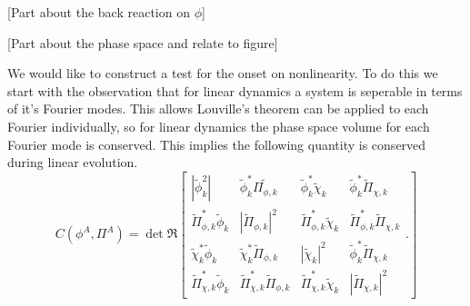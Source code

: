 [Part about the back reaction on $\phi$]

[Part about the phase space and relate to figure]

\Fspec

\Fspecdet

We would like to construct a test for the onset on nonlinearity.
To do this we start with the observation that for linear dynamics a system is seperable in terms of it's Fourier modes.
This allows Louville's theorem can be applied to each Fourier individually, so for linear dynamics the phase space volume for each Fourier mode is conserved.
This implies the following quantity is conserved during linear evolution.
\begin{equation}
  C(\phi^A,\Pi^A) =
  \det\Re\left[
    \begin{matrix}
      |\tilde{\phi}_k^2| & \tilde{\phi}_k^*\tilde{\Pi_{\phi, k}} & \tilde{\phi}_k^*\tilde{\chi}_k & \tilde{\phi}_k^*\tilde{\Pi}_{\chi, k} \\
      \tilde{\Pi}_{\phi,k}^*\tilde{\phi}_k & |\tilde{\Pi}_{\phi, k}|^2 & \tilde{\Pi}_{\phi,k}^*\tilde{\chi}_k & \tilde{\Pi}_{\phi,k}^*\tilde{\Pi}_{\chi, k} \\
      \tilde{\chi}_k^*\tilde{\phi}_k & \tilde{\chi}_k^*\tilde{\Pi}_{\phi, k} & |\tilde{\chi}_k|^2 & \tilde{\phi}_k^*\tilde{\Pi}_{\chi, k} \\
      \tilde{\Pi}_{\chi,k}^*\tilde{\phi}_k & \tilde{\Pi}_{\chi, k}^*\tilde{\Pi}_{\phi, k} & \tilde{\Pi}_{\chi,k}^*\tilde{\chi}_k & |\tilde{\Pi}_{\chi, k}|^2
    \end{matrix}.
  \right]
\end{equation}



